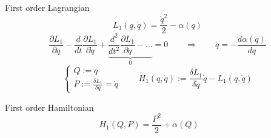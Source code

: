 \documentclass[10pt]{beamer}
\begin{document}
  \begin{frame}{First order Lagrangian}
    \begin{equation*}
      L_1(q, \dot{q}) = \frac{\dot{q}^2}{2} - \alpha(q)
    \end{equation*}
    \vspace{0.2em}
    \begin{equation*} \label{eq: first-order_motion_eq_lagr}
      \frac{\partial L_1}{\partial q} -
      \frac{d}{dt}\frac{\partial L_1}{\partial \dot{q}} +
      \underbrace{
      \frac{d^2}{dt^2}\frac{\partial L_1}{\partial \ddot{q}} - \ldots }_0 = 0
      \qquad \Rightarrow \qquad
      \ddot{q} = - \frac{d\alpha(q)}{dq}
    \end{equation*}
    \begin{equation*}
      \begin{cases}
        Q := q \\
        P := \frac{\delta L_1}{\delta \dot{q}} = \dot{q}
      \end{cases}
      \qquad
      \tilde{H}_1(q, \dot{q}) :=
      \frac{\delta L_1}{\delta \dot{q}} \dot{q} - L_1(q, \dot{q})
    \end{equation*}
    \begin{block}{First order Hamiltonian}
      \begin{equation*} \label{eq: first-order_motion_eq_ham}
        H_1(Q, P) = \frac{P^2}{2} + \alpha(Q) \qquad
      \end{equation*}
    \end{block}
  \end{frame}
\end{document}
